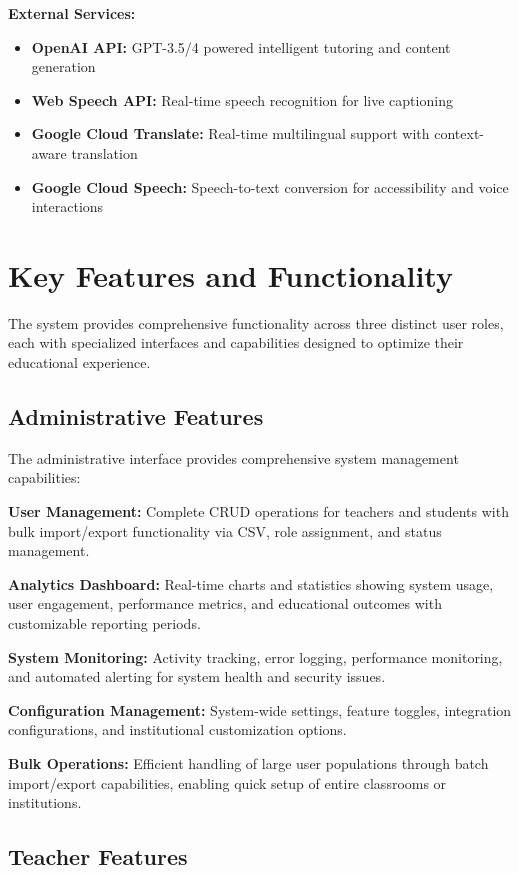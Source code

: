 \documentclass[onecolumn]{IEEEtran}
\begin{document}
\textbf{External Services:}
\begin{itemize}
\item \textbf{OpenAI API:} GPT-3.5/4 powered intelligent tutoring and content generation
\item \textbf{Web Speech API:} Real-time speech recognition for live captioning
\item \textbf{Google Cloud Translate:} Real-time multilingual support with context-aware translation
\item \textbf{Google Cloud Speech:} Speech-to-text conversion for accessibility and voice interactions
\end{itemize}

\section{Key Features and Functionality}

The system provides comprehensive functionality across three distinct user roles, each with specialized interfaces and capabilities designed to optimize their educational experience.

\subsection{Administrative Features}

The administrative interface provides comprehensive system management capabilities:

\textbf{User Management:} Complete CRUD operations for teachers and students with bulk import/export functionality via CSV, role assignment, and status management.

\textbf{Analytics Dashboard:} Real-time charts and statistics showing system usage, user engagement, performance metrics, and educational outcomes with customizable reporting periods.

\textbf{System Monitoring:} Activity tracking, error logging, performance monitoring, and automated alerting for system health and security issues.

\textbf{Configuration Management:} System-wide settings, feature toggles, integration configurations, and institutional customization options.

\textbf{Bulk Operations:} Efficient handling of large user populations through batch import/export capabilities, enabling quick setup of entire classrooms or institutions.

\subsection{Teacher Features}
\end{document}
